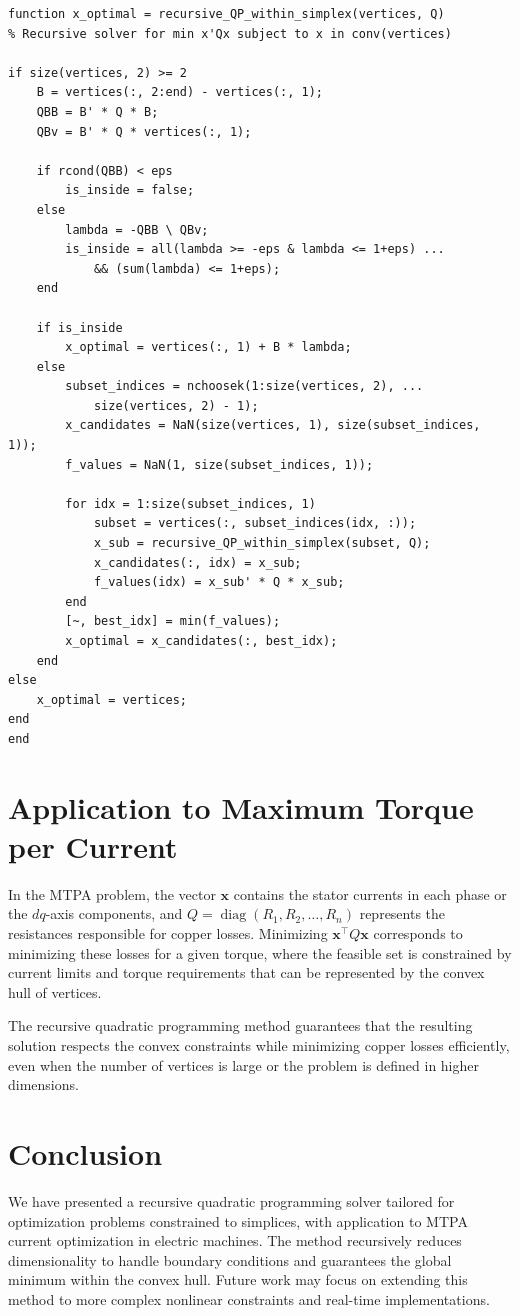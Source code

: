 \begin{lstlisting}[style=matlab,caption={Recursive quadratic minimization within a simplex},label={lst:recursive_qp}]
function x_optimal = recursive_QP_within_simplex(vertices, Q)
% Recursive solver for min x'Qx subject to x in conv(vertices)

if size(vertices, 2) >= 2
    B = vertices(:, 2:end) - vertices(:, 1);
    QBB = B' * Q * B;
    QBv = B' * Q * vertices(:, 1);

    if rcond(QBB) < eps
        is_inside = false;
    else
        lambda = -QBB \ QBv;
        is_inside = all(lambda >= -eps & lambda <= 1+eps) ...
            && (sum(lambda) <= 1+eps);
    end

    if is_inside
        x_optimal = vertices(:, 1) + B * lambda;
    else
        subset_indices = nchoosek(1:size(vertices, 2), ...
            size(vertices, 2) - 1);
        x_candidates = NaN(size(vertices, 1), size(subset_indices, 1));
        f_values = NaN(1, size(subset_indices, 1));

        for idx = 1:size(subset_indices, 1)
            subset = vertices(:, subset_indices(idx, :));
            x_sub = recursive_QP_within_simplex(subset, Q);
            x_candidates(:, idx) = x_sub;
            f_values(idx) = x_sub' * Q * x_sub;
        end
        [~, best_idx] = min(f_values);
        x_optimal = x_candidates(:, best_idx);
    end
else
    x_optimal = vertices;
end
end
\end{lstlisting}

\section{Application to Maximum Torque per Current}

In the MTPA problem, the vector \(\mathbf{x}\) contains the stator currents
in each phase or the $dq$-axis components, and
\(Q=\operatorname{diag}(R_1,R_2,\ldots,R_n)\) represents the resistances
responsible for copper losses. Minimizing \(\mathbf{x}^\top Q\mathbf{x}\)
corresponds to minimizing these losses for a given torque, where the feasible
set is constrained by current limits and torque requirements that can be
represented by the convex hull of vertices.

The recursive quadratic programming method guarantees that the resulting
solution respects the convex constraints while minimizing copper losses
efficiently, even when the number of vertices is large or the problem is
defined in higher dimensions.

\section{Conclusion}

We have presented a recursive quadratic programming solver tailored for
optimization problems constrained to simplices, with application to MTPA
current optimization in electric machines. The method recursively reduces
dimensionality to handle boundary conditions and guarantees the global
minimum within the convex hull. Future work may focus on extending this
method to more complex nonlinear constraints and real-time implementations.

